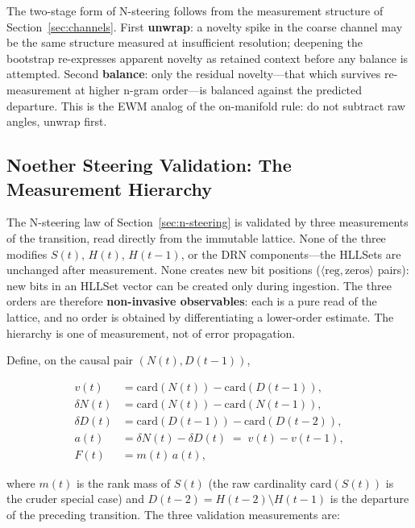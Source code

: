 \documentclass[11pt,a4paper]{article}
\theoremstyle{remark}
\begin{document}
The two-stage form of N-steering follows from the measurement structure of
Section~\ref{sec:channels}. First \textbf{unwrap}: a novelty spike in the coarse
channel may be the same structure measured at insufficient resolution; deepening
the bootstrap re-expresses apparent novelty as retained context before any
balance is attempted. Second \textbf{balance}: only the residual novelty---that
which survives re-measurement at higher n-gram order---is balanced against the
predicted departure. This is the EWM analog of the on-manifold rule: do not
subtract raw angles, unwrap first.

\subsection{Noether Steering Validation: The Measurement Hierarchy}
\label{sec:newton-hierarchy}

The N-steering law of Section~\ref{sec:n-steering} is validated by three
measurements of the transition, read directly from the immutable lattice. None
of the three modifies $S(t)$, $H(t)$, $H(t-1)$, or the DRN components---the
HLLSets are unchanged after measurement. None creates new bit positions
($\langle \text{reg}, \text{zeros} \rangle$ pairs): new bits in an HLLSet
vector can be created only during ingestion. The three orders are therefore
\textbf{non-invasive observables}: each is a pure read of the lattice, and no
order is obtained by differentiating a lower-order estimate. The hierarchy is
one of measurement, not of error propagation.

Define, on the causal pair $(N(t), D(t-1))$,

\begin{align}
  v(t) &= \text{card}(N(t)) - \text{card}(D(t-1)), \\
  \delta N(t) &= \text{card}(N(t)) - \text{card}(N(t-1)), \\
  \delta D(t) &= \text{card}(D(t-1)) - \text{card}(D(t-2)), \\
  a(t) &= \delta N(t) - \delta D(t) \;=\; v(t) - v(t-1), \\
  F(t) &= m(t)\, a(t),
\end{align}

where $m(t)$ is the rank mass of $S(t)$ (the raw cardinality
$\text{card}(S(t))$ is the cruder special case) and
$D(t-2) = H(t-2) \setminus H(t-1)$ is the departure of the preceding
transition. The three validation measurements are:
\end{document}
